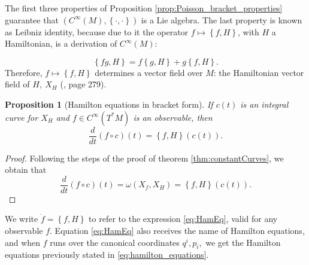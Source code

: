 \documentclass[12pt, letterpaper, reqno]{amsart}
\theoremstyle{definition}
\theoremstyle{plain}
\newtheorem{prop}{Proposition}
\theoremstyle{remark}
\begin{document}
The first three properties of Proposition \ref{prop:Poisson_bracket_properties} guarantee that $ \left( C^\infty(M), \left\{ \cdot,\cdot \right\}  \right) $ is a Lie algebra. The last property is known as Leibniz identity, because due to it the operator $ f\mapsto \left\{ f,H \right\}  $, with $ H $ a Hamiltonian, is a derivation of $ C^\infty(M): $ 

$$ \left\{ fg,H \right\} =f \left\{ g,H \right\} +g \left\{ f,H \right\} . $$ 
Therefore, $ f\mapsto \left\{ f,H \right\}  $ determines a vector field over $M$: the Hamiltonian vector field of $ H, \ X_H $ (\cite{montgomery2002tour}, page 279).

\begin{prop}[Hamilton equations in bracket form]\label{prop:HEBF}
	If $ c(t) $ is an integral curve for $ X_H $ and $ f\in C^\infty(T^*M) $ is an observable, then
	\begin{equation}\label{eq:HamEq}
		\frac{d}{dt} \left( f\circ c \right)(t) = \left\{ f,H \right\} (c(t)).
	\end{equation}
\end{prop}
\begin{proof}
	Following the steps of the proof of theorem \ref{thm:constantCurves}, we obtain that
	$$ \frac{d}{dt} \left( f\circ c \right) (t)=\omega(X_f, X_H)= \left\{ f,H \right\}(c(t)).  $$ 
\end{proof}

We write $ \dot{f}= \left\{ f,H \right\} $ to refer to the expression \eqref{eq:HamEq}, valid for any observable $ f. $ Equation \eqref{eq:HamEq} also receives the name of Hamilton equations, and when $ f $ runs over the canonical coordinates $ q^i,p_i, $ we get the Hamilton equations previously stated in \eqref{eq:hamilton_equations}.
\end{document}
